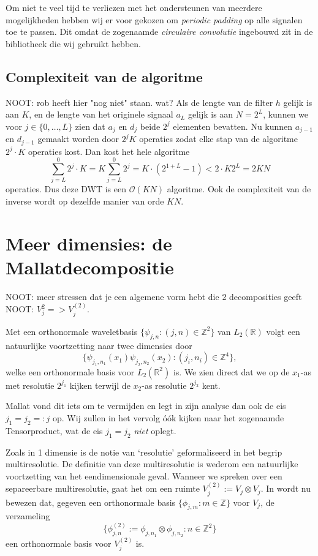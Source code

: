 \documentclass[11pt]{report}
\newcommand{\R}{\mathbb{R}}
\newcommand{\Z}{\mathbb{Z}}
\theoremstyle{plain}
\theoremstyle{remark}
\begin{document}
Om niet te veel tijd te verliezen met het ondersteunen van meerdere mogelijkheden hebben wij er voor gekozen om \emph{periodic padding} op alle signalen toe te passen. Dit omdat de zogenaamde \emph{circulaire convolutie} ingebouwd zit in de bibliotheek die wij gebruikt hebben.

\subsection{Complexiteit van de algoritme}
NOOT: rob heeft hier "nog niet" staan. wat?
Als de lengte van de filter $h$ gelijk is aan $K$, en de lengte van het originele signaal $a_L$ gelijk is aan $N = 2^{L}$, kunnen we voor $j \in \{0, \ldots, L\}$ zien dat $a_j$ en $d_j$ beide $2^{j}$ elementen bevatten. Nu kunnen $a_{j-1}$ en $d_{j-1}$ gemaakt worden door $2^{j}K$ operaties zodat elke stap van de algoritme $2^{j} \cdot K$ operaties kost. Dan kost het hele algoritme
\[
	\sum_{j=L}^0 2^{j} \cdot K = K \sum_{j=L}^0 2^{j} = K \cdot (2^{1+L} - 1) < 2 \cdot K 2^{L} = 2KN
\]
operaties. Dus deze DWT is een $\mathcal{O}(KN)$ algoritme. Ook de complexiteit van de inverse wordt op dezelfde manier van orde $KN$. 

\section{Meer dimensies: de Mallatdecompositie}
NOOT: meer stressen dat je een algemene vorm hebt die 2 decomposities geeft
NOOT: $V^2_j => V^{(2)}_j$.

Met een orthonormale waveletbasis $\{ \psi_{j,n}: (j,n) \in \Z^2\}$ van $L_2(\R)$ volgt een natuurlijke voortzetting naar twee dimensies door
\[
  \{ \psi_{j_1,n_1}(x_1) \psi_{j_2,n_2}(x_2): (j_i,n_i) \in \Z^4 \},
\]
welke een orthonormale basis voor $L_2(\R^2)$ is. We zien direct dat we op de $x_1$-as met resolutie $2^{j_1}$ kijken terwijl de $x_2$-as resolutie $2^{j_2}$ kent. 

Mallat vond dit iets om te vermijden \cite[\S 7.7]{mallat} en legt in zijn analyse dan ook de eis $j_1 = j_2 =: j$ op. Wij zullen in het vervolg \'o\'ok kijken naar het zogenaamde Tensorproduct, wat de eis $j_1 = j_2$ \emph{niet} oplegt.

Zoals in 1 dimensie is de notie van `resolutie' geformaliseerd in het begrip multiresolutie. De definitie van deze multiresolutie is wederom een natuurlijke voortzetting van het eendimensionale geval. Wanneer we spreken over een separeerbare multiresolutie, gaat het om een ruimte $V_j^{(2)} := V_j \otimes V_j$. In \cite[A.5]{mallat} wordt nu bewezen dat, gegeven een orthonormale basis $\{ \phi_{j,m}: m \in \Z \}$ voor $V_j$, de verzameling
\[
	\{ \phi^{(2)}_{j,n} := \phi_{j,n_1} \otimes \phi_{j,n_2}: n \in \Z^2 \}
\]
een orthonormale basis voor $V_j^{(2)}$ is.
\end{document}
